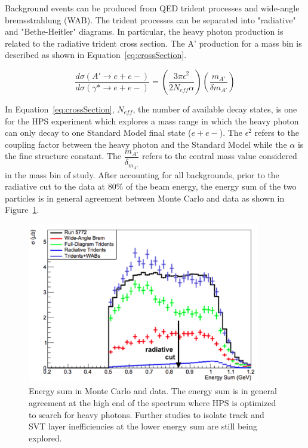 Background events can be produced from QED trident processes and wide-angle bremsstrahlung (WAB). The trident processes can be separated into "radiative" and "Bethe-Heitler" diagrams. In particular, the heavy photon production is related to the radiative trident cross section. The A' production for a mass bin is described as shown in Equation~\eqref{eq:crossSection}.

\begin{equation}
\label{eq:crossSection}
\dfrac{d\sigma(A'\rightarrow e+e-)}{d\sigma(\gamma*\rightarrow e+e-)} = \left(\dfrac{3\pi\epsilon^{2}}{2N_{eff}\alpha}\right)\left(\dfrac{m_{A'}}{\delta m_{A'}}\right)
\end{equation}

In Equation~\eqref{eq:crossSection}, $N_{eff}$, the number of available decay states, is one for the HPS experiment which explores a mass range in which the heavy photon can only decay to one Standard Model final state ($e+e-$). The $\epsilon^{2}$ refers to the coupling factor between the heavy photon and the Standard Model while the $\alpha$ is the fine structure constant. The $\dfrac{m_{A'}}{\delta_{m_{A'}}}$ refers to the central mass value considered in the mass bin of study. After accounting for all backgrounds, prior to the radiative cut to the data at 80$\%$ of the beam energy, the energy sum of the two particles is in general agreement between Monte Carlo and data as shown in Figure~\ref{fig:mcAgree}.

\begin{figure}[H]
  \centering
      \includegraphics[width=0.9\textwidth]{pics/searching/mcAgree.png}
  \caption[Energy sum comparison in Monte Carlo and data]{Energy sum in Monte Carlo and data. The energy sum is in general agreement at the high end of the spectrum where HPS is optimized to search for heavy photons. Further studies to isolate track and SVT layer inefficiencies at the lower energy sum are still being explored.}
  \label{fig:mcAgree}
\end{figure} 

